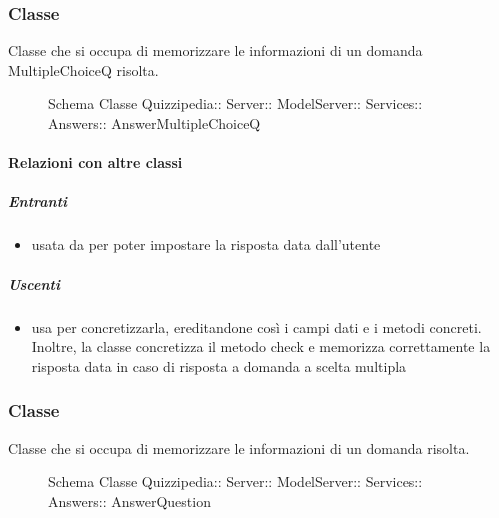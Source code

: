 \subsubsection{Classe }
Classe che si occupa di memorizzare le informazioni di un domanda MultipleChoiceQ risolta.
\begin{figure}[H]
\centering
\noindent{}
\caption[Schema Classe AnswerMultipleChoiceQ]{Schema Classe Quizzipedia:: Server:: ModelServer:: Services:: Answers:: AnswerMultipleChoiceQ}
\end{figure}
\paragraph{Relazioni con altre classi}
\subparagraph{Entranti}
\begin{itemize}
\item usata da  per poter impostare la risposta data dall'utente
\end{itemize}
\subparagraph{Uscenti}
\begin{itemize}
\item usa  per concretizzarla, ereditandone così i campi dati e i metodi concreti. Inoltre, la classe concretizza il metodo check e memorizza correttamente la risposta data in caso di risposta a domanda a scelta multipla
\end{itemize}
\subsubsection{Classe }
Classe che si occupa di memorizzare le informazioni di un domanda risolta.
\begin{figure}[H]
\centering
\noindent{}
\caption[Schema Classe AnswerQuestion]{Schema Classe Quizzipedia:: Server:: ModelServer:: Services:: Answers:: AnswerQuestion}
\end{figure}
